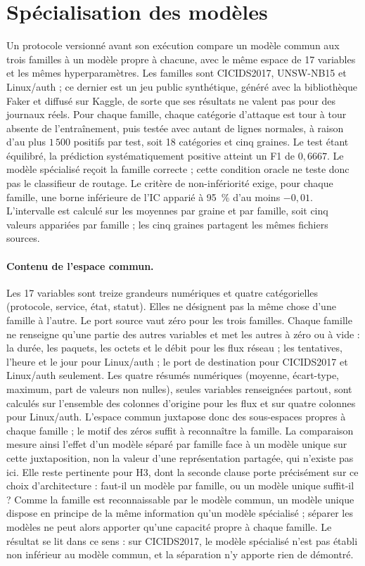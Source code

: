 \section{Spécialisation des modèles}
\label{sec:e-h3b}

Un protocole versionné avant son exécution compare un modèle commun aux trois familles à un modèle propre à chacune, avec le même espace de 17 variables et les mêmes hyperparamètres. Les familles sont CICIDS2017, UNSW-NB15 et Linux/auth ; ce dernier est un jeu public synthétique, généré avec la bibliothèque Faker et diffusé sur Kaggle, de sorte que ses résultats ne valent pas pour des journaux réels. Pour chaque famille, chaque catégorie d'attaque est tour à tour absente de l'entraînement, puis testée avec autant de lignes normales, à raison d'au plus $1\,500$ positifs par test, soit 18 catégories et cinq graines. Le test étant équilibré, la prédiction systématiquement positive atteint un F1 de $0{,}6667$. Le modèle spécialisé reçoit la famille correcte ; cette condition oracle ne teste donc pas le classifieur de routage. Le critère de non-infériorité exige, pour chaque famille, une borne inférieure de l'IC apparié à 95~\% d'au moins $-0{,}01$. L'intervalle est calculé sur les moyennes par graine et par famille, soit cinq valeurs appariées par famille ; les cinq graines partagent les mêmes fichiers sources.

\paragraph{Contenu de l'espace commun.} Les 17 variables sont treize grandeurs numériques et quatre catégorielles (protocole, service, état, statut). Elles ne désignent pas la même chose d'une famille à l'autre. Le port source vaut zéro pour les trois familles. Chaque famille ne renseigne qu'une partie des autres variables et met les autres à zéro ou à vide : la durée, les paquets, les octets et le débit pour les flux réseau ; les tentatives, l'heure et le jour pour Linux/auth ; le port de destination pour CICIDS2017 et Linux/auth seulement. Les quatre résumés numériques (moyenne, écart-type, maximum, part de valeurs non nulles), seules variables renseignées partout, sont calculés sur l'ensemble des colonnes d'origine pour les flux et sur quatre colonnes pour Linux/auth. L'espace commun juxtapose donc des sous-espaces propres à chaque famille ; le motif des zéros suffit à reconnaître la famille. La comparaison mesure ainsi l'effet d'un modèle séparé par famille face à un modèle unique sur cette juxtaposition, non la valeur d'une représentation partagée, qui n'existe pas ici. Elle reste pertinente pour H3, dont la seconde clause porte précisément sur ce choix d'architecture : faut-il un modèle par famille, ou un modèle unique suffit-il ? Comme la famille est reconnaissable par le modèle commun, un modèle unique dispose en principe de la même information qu'un modèle spécialisé ; séparer les modèles ne peut alors apporter qu'une capacité propre à chaque famille. Le résultat se lit dans ce sens : sur CICIDS2017, le modèle spécialisé n'est pas établi non inférieur au modèle commun, et la séparation n'y apporte rien de démontré.

